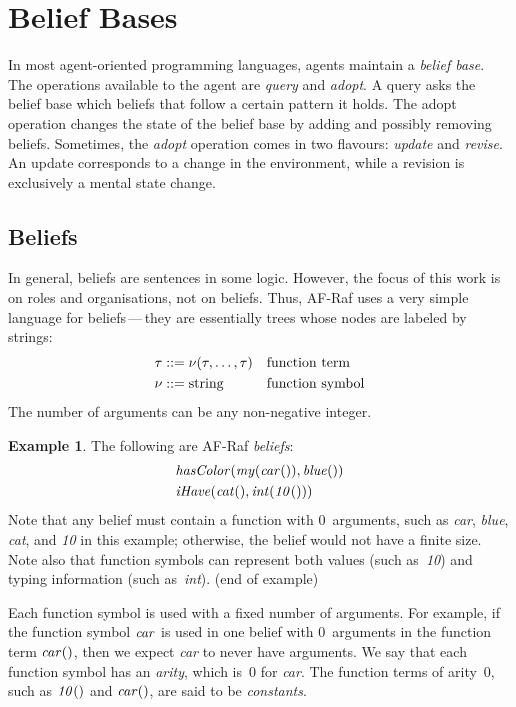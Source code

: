 \documentclass[a4paper,12pt,oneside,fleqn]{book} %
\theoremstyle{plain}
\theoremstyle{definition}
\newtheorem{example}{Example}
\theoremstyle{remark}
\newcommand{\eox}[1]{\hskip5mm\null\nobreak\hfill#1}
\newcommand{\eoe}{\eox{(end of example)}}
\begin{document}
\section{Belief Bases} %

In most agent-oriented programming languages, agents maintain a
\emph{belief base}.  The operations available to the agent are
\textit{query} and \textit{adopt}.  A query asks the belief base which
beliefs that follow a certain pattern it holds.  The adopt operation
changes the state of the belief base by adding and possibly removing
beliefs.  Sometimes, the {\it adopt\/} operation comes in two flavours:
{\it update\/} and {\it revise}.  An update corresponds to a change in the
environment, while a revision is exclusively a mental state change.

\subsection{Beliefs}

In general, beliefs are sentences in some logic.  However, the focus of
this work is on roles and organisations, not on beliefs.  Thus, AF-Raf uses
a very simple language for beliefs\,---\,they are essentially trees whose
nodes are labeled by strings: \begin{align} \tau &::= \nu(\tau,\ldots,\tau)
&& \text{function term} \\ \nu  &::= {\rm string} &&\text{function symbol}
\end{align} The number of arguments can be any non-negative integer.

\begin{example} The following are AF-Raf \emph{beliefs}: \begin{align}
&{\it hasColor}({\it my}({\it car}()), {\it blue}()) \\ &{\it iHave}({\it
cat}(), {\it int}({\it 10}())) \end{align} Note that any belief must
contain a function with $0$~arguments, such as {\it car}, {\it blue}, {\it
cat}, and {\it 10\/} in this example; otherwise, the belief would not have
a finite size.  Note also that function symbols can represent both values
(such as~{\it 10\/}) and typing information (such as~{\it int\/}).  \eoe
\end{example}

Each function symbol is used with a fixed number of arguments.  For
example, if the function symbol ${\it car}$ is used in one belief with
$0$~arguments in the function term ${\it car}()$, then we expect {\it
car\/} to never have arguments.  We say that each function symbol has an
\emph{arity}, which is~$0$ for {\it car}.  The function terms of arity~$0$,
such as ${\it 10}()$ and ${\it car}()$, are said to be \emph{constants}.
\end{document}

